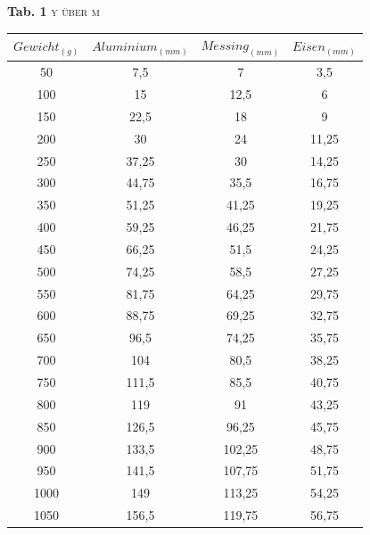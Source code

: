 \documentclass[11pt, a4paper]{article}
\begin{document}
\begin{center}
\textbf{Tab. 1}
\textsc{y über m}\\

\begin{tabular}{c|ccc}
$Gewicht_{(g)}$ & $Aluminium_{(mm)}$ & $Messing_{(mm)}$ & $Eisen_{(mm)}$ \\
\hline
50		&	7,5		&	7		&	3,5\\
100		&	15		&	12,5	&	6\\
150		&	22,5	&	18		&	9\\
200		&	30		&	24		&	11,25\\
250		&	37,25	&	30		&	14,25\\
300		&	44,75	&	35,5	&	16,75\\
350		&	51,25	&	41,25	&	19,25\\
400		&	59,25	&	46,25	&	21,75\\
450		&	66,25	&	51,5	&	24,25\\
500		&	74,25	&	58,5	&	27,25\\
550		&	81,75	&	64,25	&	29,75\\
600		&	88,75	&	69,25	&	32,75\\
650		&	96,5	&	74,25	&	35,75\\
700		&	104		&	80,5	&	38,25\\
750		&	111,5	&	85,5	&	40,75\\
800		&	119 	&	91		&	43,25\\
850		&	126,5	&	96,25	&	45,75\\
900		&	133,5	&	102,25	&	48,75\\
950		&	141,5	&	107,75	&	51,75\\
1000	&	149		&	113,25	&	54,25\\
1050	&	156,5	&	119,75	&	56,75\\

\end{tabular}\newpage


\end{center}
\end{document}
